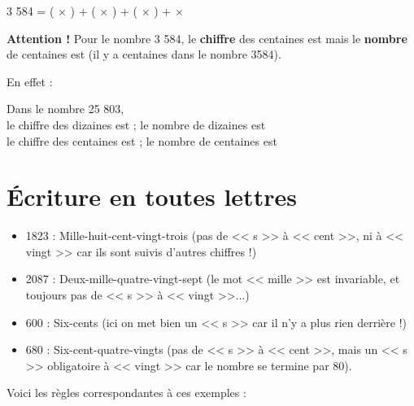 \begin{examplebox}
	3 584 = (\trous{1cm} $\times$ \trous{2cm}) + (\trous{1cm} $\times$ \trous{1.5cm}) + (\trous{0.5cm} $\times$ \trous{1cm}) + \trous{0.5cm} $\times$ \trous{0.5cm}
\end{examplebox}



\textbf{Attention !} Pour le nombre 3 584, le \textbf{chiffre} des centaines est \trous{2cm} mais le \textbf{nombre} de centaines est \trous{3cm} (il y a \trous{2cm} centaines dans le nombre 3584).

En effet :
\trous{14cm}

\trous{15.5cm}


\begin{examplebox}
Dans le nombre 25 803,\\ 

le chiffre des dizaines est \trous{1.5cm}; le nombre de dizaines est \trous{2.5cm}\\

le chiffre des centaines est \trous{1.5cm} ; le nombre de centaines est \trous{2.5cm}
\end{examplebox}

\section{Écriture en toutes lettres}

\begin{examplebox}
	\begin{itemize}[label = \textbullet]
		\item 1823 : Mille-huit-cent-vingt-trois (pas de << s >> à << cent >>, ni à << vingt >> car ils sont suivis d'autres chiffres !)
		\item 2087 : Deux-mille-quatre-vingt-sept (le mot << mille >> est invariable, et toujours pas de << s >> à << vingt >>...)
		\item 600 : Six-cents (ici on met bien un << s >> car il n'y a plus rien derrière !)
		\item 680 : Six-cent-quatre-vingts (pas de << s >> à << cent >>, mais un << s >> obligatoire à << vingt >> car le nombre se termine par 80).
	\end{itemize}
\end{examplebox}

Voici les règles correspondantes à ces exemples :

